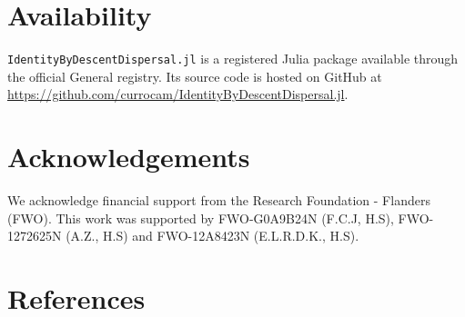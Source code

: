 \documentclass[
]{article}
\begin{document}
\section*{Availability}\label{availability}

\texttt{IdentityByDescentDispersal.jl} is a registered Julia package
available through the official General registry. Its source code is
hosted on GitHub at
\url{https://github.com/currocam/IdentityByDescentDispersal.jl}.

\section*{Acknowledgements}\label{acknowledgements}

We acknowledge financial support from the Research Foundation - Flanders
(FWO). This work was supported by FWO-G0A9B24N (F.C.J, H.S),
FWO-1272625N (A.Z., H.S) and FWO-12A8423N (E.L.R.D.K., H.S).

\section*{References}\label{references}
\end{document}
